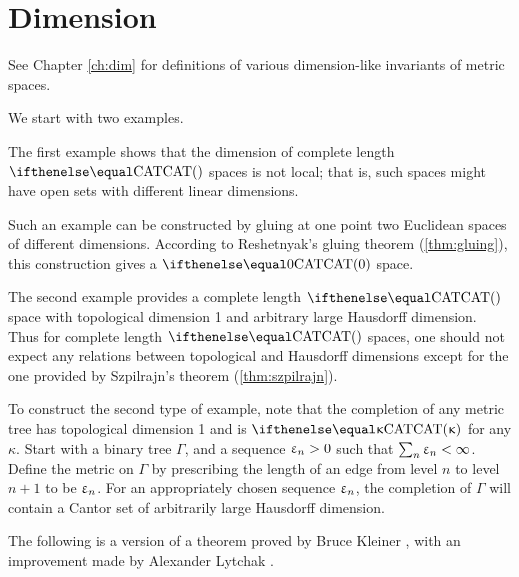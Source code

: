\section{Dimension}\label{sec:dim-cba}

See Chapter \ref{ch:dim} for definitions of various dimension-like invariants of metric spaces.

We start with two examples.

The first example shows that the dimension of complete length $\CAT{}$ spaces is not local;
that is, such spaces might have open sets with different linear dimensions.

Such an example can be constructed by gluing at one point two Euclidean spaces of different dimensions.
According to Reshetnyak's gluing theorem (\ref{thm:gluing}), this construction gives a $\CAT{0}$ space.

The second example provides a complete length $\CAT{}$ space 
with topological dimension 1 and arbitrary large Hausdorff dimension.
Thus for complete length $\CAT{}$ spaces, one should not expect any relations between topological and Hausdorff dimensions except for the one provided by Szpilrajn's theorem (\ref{thm:szpilrajn}).

To construct the second type of example,
note that the completion of any metric tree has topological dimension 1 and is $\CAT\kappa$ for any $\kappa$.
Start with a binary tree $\Gamma$, and a sequence $\upvarepsilon_n>0$ such that $\sum_n\upvarepsilon_n<\infty$.
Define the metric on $\Gamma$
by prescribing the length of an edge from level $n$ to level $n+1$ to be $\upvarepsilon_n$.
For an appropriately chosen sequence $\upvarepsilon_n$, the completion of $\Gamma$ will contain a Cantor set of arbitrarily large Hausdorff dimension.

\medskip

The following is a version of a theorem proved by Bruce Kleiner \cite{kleiner}, with an improvement made by Alexander Lytchak \cite{lytchak:diff}.

